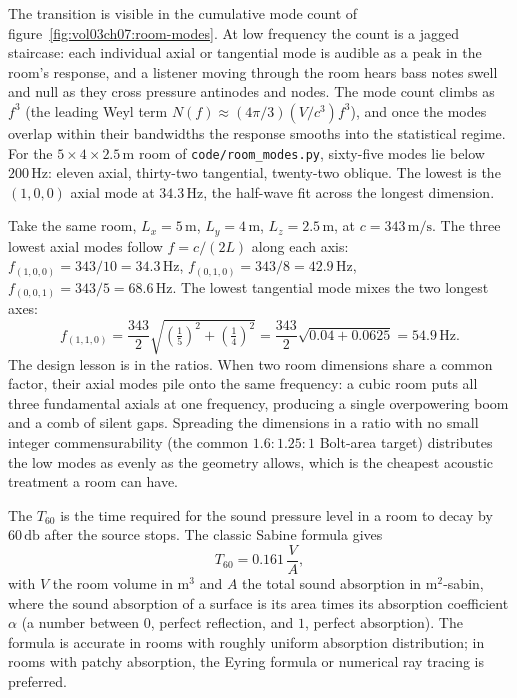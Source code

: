 

The transition is visible in the cumulative mode count of
figure~\ref{fig:vol03ch07:room-modes}. At low frequency the count is a
jagged staircase: each individual axial or tangential mode is audible
as a peak in the room's response, and a listener moving through the
room hears bass notes swell and null as they cross pressure antinodes
and nodes. The mode count climbs as $f^3$ (the leading Weyl term
$N(f)\approx(4\pi/3)(V/c^3)f^3$), and once the modes overlap within
their bandwidths the response smooths into the statistical regime. For
the $5\times4\times2.5\,\si{\meter}$ room of
\texttt{code/room\_modes.py}, sixty-five modes lie below
$200\,\si{\hertz}$: eleven axial, thirty-two tangential, twenty-two
oblique. The lowest is the $(1,0,0)$ axial mode at $34.3\,\si{\hertz}$,
the half-wave fit across the longest dimension.

\begin{example}
Take the same room, $L_x=5\,\si{\meter}$, $L_y=4\,\si{\meter}$,
$L_z=2.5\,\si{\meter}$, at $c=343\,\si{\meter\per\second}$. The three
lowest axial modes follow $f = c/(2L)$ along each axis:
$f_{(1,0,0)} = 343/10 = 34.3\,\si{\hertz}$,
$f_{(0,1,0)} = 343/8 = 42.9\,\si{\hertz}$,
$f_{(0,0,1)} = 343/5 = 68.6\,\si{\hertz}$. The lowest tangential mode
mixes the two longest axes:
\[
f_{(1,1,0)} = \frac{343}{2}\sqrt{\left(\tfrac{1}{5}\right)^2 +
\left(\tfrac{1}{4}\right)^2} = \frac{343}{2}\sqrt{0.04 + 0.0625}
= 54.9\,\si{\hertz}.
\]
The design lesson is in the ratios. When two room dimensions share a
common factor, their axial modes pile onto the same frequency: a cubic
room puts all three fundamental axials at one frequency, producing a
single overpowering boom and a comb of silent gaps. Spreading the
dimensions in a ratio with no small integer commensurability (the
common $1.6 : 1.25 : 1$ Bolt-area target) distributes the low modes as
evenly as the geometry allows, which is the cheapest acoustic
treatment a room can have.
\end{example}

The  $T_{60}$ is the time required for
the sound pressure level in a room to decay by $60\,\si{\decibel}$
after the source stops. The classic Sabine formula gives
\[
T_{60} = 0.161\,\frac{V}{A},
\]
with $V$ the room volume in $\si{\meter\cubed}$ and $A$ the total
sound absorption in $\si{\meter\squared}$-sabin, where the
sound absorption of a surface is its area times its absorption
coefficient $\alpha$ (a number between $0$, perfect reflection, and
$1$, perfect absorption). The formula is accurate in rooms with
roughly uniform absorption distribution; in rooms with patchy
absorption, the Eyring formula or numerical ray tracing is preferred.


